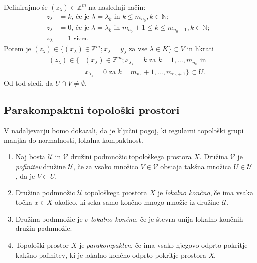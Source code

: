 \documentclass[mat1]{fmfdelo}
\newcommand{\N}{\mathbb N}
\newcommand{\Z}{\mathbb Z}
\begin{document}
\begin{dokaz}
Definirajmo še $(z_\lambda) \in \Z^m$ na naslednji način:
\begin{align*}
	z_\lambda &= k \text{, če je $\lambda = \lambda_k$ in $k \leq m_{n_0}$}, k \in \N; \\
	z_\lambda &= 0 \text{, če je $\lambda = \lambda_k$ in $m_{n_0} + 1 \leq k \leq m_{n_0+1}$}, k \in \N; \\
	z_\lambda &= 1 \text{ sicer.}
\end{align*}
Potem je $(z_\lambda) \in \lbrace (x_\lambda) \in \Z^m ; x_\lambda = y_\lambda \text{ za vse } \lambda  \in K \rbrace \subset V$ in hkrati
\begin{align*}
(z_\lambda) \in \lbrace &(x_\lambda) \in \Z^m ; x_{\lambda_k} = k \text{ za } k=1,\dots,m_{n_0} \text{ in }\\
& x_{\lambda_k} = 0 \text{ za } k = m_{n_0}+1,\dots, m_{n_0 + 1}\rbrace \subset U.
\end{align*}
Od tod sledi, da $U \cap V \neq \emptyset$.
\end{dokaz}

\subsection{Parakompaktni topološki prostori}
V nadaljevanju bomo dokazali, da je ključni pogoj, ki regularni topološki grupi manjka do normalnosti, lokalna kompaktnost.

\begin{definicija}\label{def:parakompakt}
	\begin{enumerate}
		\item Naj bosta $\mathcal{U}$ in $\mathcal{V}$ družini podmnožic topološkega prostora $X$. Družina $\mathcal{V}$ je \emph{pofinitev} družine $\mathcal{U}$, če za vsako množico $V \in \mathcal{V}$ obstaja takšna množica $U \in \mathcal{U}$, da je $V \subset U$.
		\item Družina podmnožic $\mathcal{U}$ topološkega prostora $X$ je \emph{lokalno končna}, če ima vsaka točka $x \in X$ okolico, ki seka samo končno mnogo množic iz družine $\mathcal{U}$.
		\item Družina podmnožic je \emph{$\sigma$-lokalno končna}, če je števna unija lokalno končnih družin podmnožic.
		\item Topološki prostor $X$ je \emph{parakompakten}, če ima vsako njegovo odprto pokritje kakšno pofinitev, ki je lokalno končno odprto pokritje prostora $X$.
	\end{enumerate}
\end{definicija}
\end{document}
